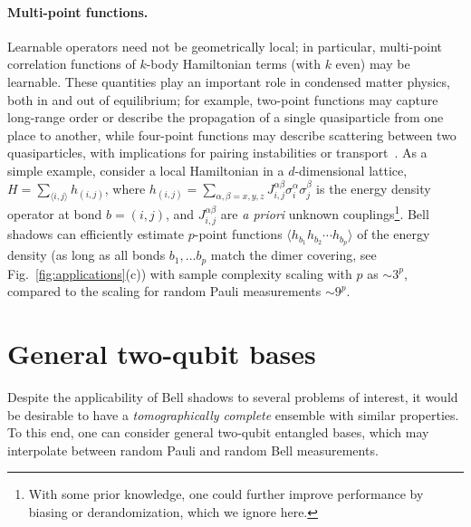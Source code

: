 \documentclass[a4paper,twocolumns,11pt,accepted=2024-03-04]{quantumarticle}
\begin{document}
\paragraph{Multi-point functions.}
Learnable operators need not be geometrically local; 
in particular, multi-point correlation functions of $k$-body Hamiltonian terms (with $k$ even) may be learnable. These quantities play an important role in condensed matter physics, both in and out of equilibrium; for example, two-point functions may capture long-range order or describe the propagation of a single quasiparticle from one place to another, while four-point functions may describe {scattering} between two quasiparticles, with implications for pairing instabilities or transport~\cite{altland_condensed_2010,chowdhury_multipoint_2013,takacs_correlation_2018,kugler_multipoint_2021}. 
As a simple example, consider a local Hamiltonian in a $d$-dimensional lattice, $H = \sum_{\langle i , j \rangle} h_{(i,j)}$, where $h_{(i,j)} = \sum_{\alpha,\beta = x,y,z} J_{i,j}^{\alpha\beta}\sigma_i^\alpha \sigma_j^\beta$ is the energy density operator at bond $b = (i,j)$, and $J_{i,j}^{\alpha\beta}$ are {\it a priori} unknown couplings\footnote{With some prior knowledge, one could further improve performance by biasing or derandomization, which we ignore here.}.
Bell shadows can efficiently estimate $p$-point functions $\langle h_{b_1} h_{b_2}\cdots h_{b_p}\rangle$ of the energy density (as long as all bonds $b_1,\dots b_p$ match the dimer covering, see Fig.~\ref{fig:applications}(c)) with sample complexity scaling with $p$ as $\sim 3^p$, compared to the scaling for random Pauli measurements $\sim 9^{p}$. 


\section{General two-qubit bases} \label{sec:quasi-bell}

Despite the applicability of Bell shadows to several problems of interest, it would be desirable to have a {\it tomographically complete} ensemble with similar properties.
To this end, one can consider general two-qubit entangled bases, which may interpolate between random Pauli and random Bell measurements.
\end{document}
